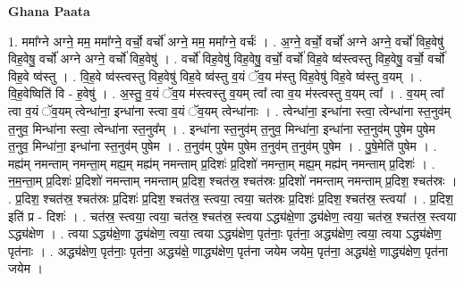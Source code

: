 \documentclass[17pt]{extarticle}
\begin{document}
\textbf{Ghana Paata } \newline

1. ममा᳚ग्ने अग्ने॒ मम॒ ममा᳚ग्ने॒ वर्चो॒ वर्चो॑ अग्ने॒ मम॒ ममा᳚ग्ने॒ वर्चः॑ । . अ॒ग्ने॒ वर्चो॒ वर्चो॑ अग्ने अग्ने॒ वर्चो॑ विह॒वेषु॑ विह॒वेषु॒ वर्चो॑ अग्ने अग्ने॒ वर्चो॑ विह॒वेषु॑ । . वर्चो॑ विह॒वेषु॑ विह॒वेषु॒ वर्चो॒ वर्चो॑ विह॒वे ष्व॑स्त्वस्तु विह॒वेषु॒ वर्चो॒ वर्चो॑ विह॒वे ष्व॑स्तु । . वि॒ह॒वे ष्व॑स्त्वस्तु विह॒वेषु॑ विह॒वे ष्व॑स्तु व॒यं ॅव॒य म॑स्तु विह॒वेषु॑ विह॒वे ष्व॑स्तु व॒यम् । . वि॒ह॒वेष्विति॑ वि - ह॒वेषु॑ । . अ॒स्तु॒ व॒यं ॅव॒य म॑स्त्वस्तु व॒यम् त्वा᳚ त्वा व॒य म॑स्त्वस्तु व॒यम् त्वा᳚ । . व॒यम् त्वा᳚ त्वा व॒यं ॅव॒यम् त्वेन्धा॑ना॒ इन्धा॑ना स्त्वा व॒यं ॅव॒यम् त्वेन्धा॑नाः । . त्वेन्धा॑ना॒ इन्धा॑ना स्त्वा॒ त्वेन्धा॑ना स्त॒नुव॑म् त॒नुव॒ मिन्धा॑ना स्त्वा॒ त्वेन्धा॑ना स्त॒नुव᳚म् । . इन्धा॑ना स्त॒नुव॑म् त॒नुव॒ मिन्धा॑ना॒ इन्धा॑ना स्त॒नुव॑म् पुषेम पुषेम त॒नुव॒ मिन्धा॑ना॒ इन्धा॑ना स्त॒नुव॑म् पुषेम । . त॒नुव॑म् पुषेम पुषेम त॒नुव॑म् त॒नुव॑म् पुषेम । . पु॒षे॒मेति॑ पुषेम । . मह्य॑म् नमन्ताम् नमन्ता॒म् मह्य॒म् मह्य॑म् नमन्ताम् प्र॒दिशः॑ प्र॒दिशो॑ नमन्ता॒म् मह्य॒म् मह्य॑म् नमन्ताम् प्र॒दिशः॑ । . न॒म॒न्ता॒म् प्र॒दिशः॑ प्र॒दिशो॑ नमन्ताम् नमन्ताम् प्र॒दिश॒ श्चत॑स्र॒ श्चत॑स्रः प्र॒दिशो॑ नमन्ताम् नमन्ताम् प्र॒दिश॒ श्चत॑स्रः । . प्र॒दिश॒ श्चत॑स्र॒ श्चत॑स्रः प्र॒दिशः॑ प्र॒दिश॒ श्चत॑स्र॒ स्त्वया॒ त्वया॒ चत॑स्रः प्र॒दिशः॑ प्र॒दिश॒ श्चत॑स्र॒ स्त्वया᳚ । . प्र॒दिश॒ इति॑ प्र - दिशः॑ । . चत॑स्र॒ स्त्वया॒ त्वया॒ चत॑स्र॒ श्चत॑स्र॒ स्त्वया ऽद्ध्य॑क्षे॒णा द्ध्य॑क्षेण॒ त्वया॒ चत॑स्र॒ श्चत॑स्र॒ स्त्वया ऽद्ध्य॑क्षेण । . त्वया ऽद्ध्य॑क्षे॒णा द्ध्य॑क्षेण॒ त्वया॒ त्वया ऽद्ध्य॑क्षेण॒ पृत॑नाः॒ पृत॑ना॒ अद्ध्य॑क्षेण॒ त्वया॒ त्वया ऽद्ध्य॑क्षेण॒ पृत॑नाः । . अद्ध्य॑क्षेण॒ पृत॑नाः॒ पृत॑ना॒ अद्ध्य॑क्षे॒ णाद्ध्य॑क्षेण॒ पृत॑ना जयेम जयेम॒ पृत॑ना॒ अद्ध्य॑क्षे॒ णाद्ध्य॑क्षेण॒ पृत॑ना जयेम । \newline
\end{document}
